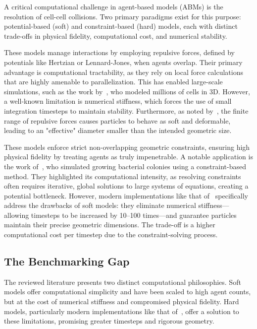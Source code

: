 \documentclass[conference]{IEEEtran}
\begin{document}
A critical computational challenge in agent-based models (ABMs) is the resolution of cell-cell collisions. Two primary paradigms exist for this purpose: potential-based (soft) and constraint-based (hard) models, each with distinct trade-offs in physical fidelity, computational cost, and numerical stability.

\begin{description}[style=nextline]
    \item[Potential-Based (Soft) Collision Models]
        These models manage interactions by employing repulsive forces, defined by potentials like Hertzian or Lennard-Jones, when agents overlap. Their primary advantage is computational tractability, as they rely on local force calculations that are highly amenable to parallelization. This has enabled large-scale simulations, such as the work by~\cite{Warren2019}, who modeled millions of cells in 3D. However, a well-known limitation is numerical stiffness, which forces the use of small integration timesteps to maintain stability. Furthermore, as noted by~\cite{Yan2019}, the finite range of repulsive forces causes particles to behave as soft and deformable, leading to an "effective" diameter smaller than the intended geometric size.

    \item[Constraint-Based (Hard) Collision Models]
        These models enforce strict non-overlapping geometric constraints, ensuring high physical fidelity by treating agents as truly impenetrable. A notable application is the work of~\cite{Rudge2012}, who simulated growing bacterial colonies using a constraint-based method. They highlighted its computational intensity, as resolving constraints often requires iterative, global solutions to large systems of equations, creating a potential bottleneck. However, modern implementations like that of~\cite{Yan2019} specifically address the drawbacks of soft models: they eliminate numerical stiffness—allowing timesteps to be increased by 10–100 times—and guarantee particles maintain their precise geometric dimensions. The trade-off is a higher computational cost per timestep due to the constraint-solving process.
\end{description}

\subsection{The Benchmarking Gap}

The reviewed literature presents two distinct computational philosophies. Soft models offer computational simplicity and have been scaled to high agent counts, but at the cost of numerical stiffness and compromised physical fidelity. Hard models, particularly modern implementations like that of~\cite{Yan2019}, offer a solution to these limitations, promising greater timesteps and rigorous geometry.
\end{document}
